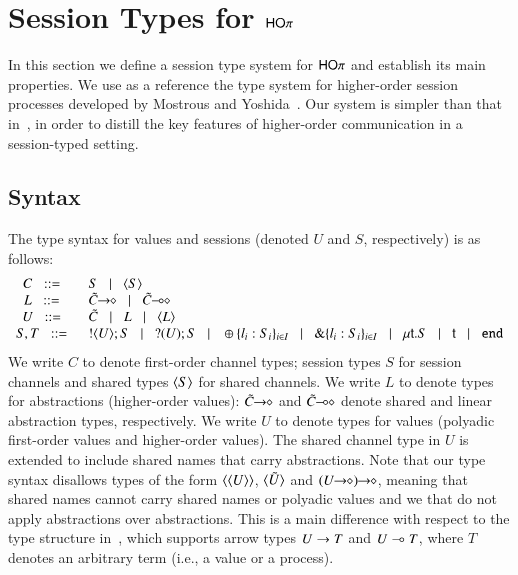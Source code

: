 \newpage
\section{Session Types for $\mathsf{HO}\pi$}
\label{s:types}

In this section we define a session type system for
$\mathsf{HO}\pi$ and establish its main properties. We use as
a reference the type system for higher-order session processes 
developed by Mostrous and Yoshida~\cite{tlca07}.
Our system is simpler than that in~\cite{tlca07}, in order to distill the key
features of higher-order communication in a session-typed setting.


\subsection{Syntax}
The type syntax for values and sessions
(denoted $U$ and $S$, respectively) is as follows:
%
\[
\begin{array}{cl}
	C \bnfis &	S \bnfbar \chtype{S}
	\\

	L \bnfis &	\shot{\tilde{C}} \bnfbar \lhot{\tilde{C}}
	\\

	U \bnfis &	\tilde{C} \bnfbar L \bnfbar \chtype{L} %
	\\

	S,T \bnfis & 	\btout{U} S \bnfbar \btinp{U} S
			\bnfbar \btsel{l_i:S_i}_{i \in I} \bnfbar \btbra{l_i:S_i}_{i \in I}
			\bnfbar \trec{t}{S} \bnfbar \vart{t}  \bnfbar \tinact
\end{array}
\]
%
\noi
We write $C$ to denote first-order channel types; session types $S$
for session channels and shared types $\langle S \rangle$ for shared channels.
We write $L$ to denote types for abstractions (higher-order values): %
$\tilde{C}\!\! \rightarrow\!\! \diamond$ and $\tilde{C}\!\! \multimap\!\! \diamond$ denote
shared and linear abstraction types, respectively.
We write $U$ to denote types for values (polyadic first-order values and 
higher-order values).
The shared channel type in $U$ is extended
to include shared names that carry abstractions.
Note that our type syntax disallows types of
the form $\langle \langle U \rangle \rangle$, $\langle \tilde{U} \rangle$
and $\shot{(\shot{U})}$,
meaning that shared names cannot carry shared names or
polyadic values and
we that do not apply abstractions over abstractions.
This is a main difference with respect to the type structure in~\cite{tlca07}, which 
supports arrow types 
$U \rightarrow T$ and 
$U \multimap T$, where $T$ denotes an arbitrary term (i.e., a value or a process).


